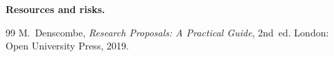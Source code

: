 \documentclass[11pt,a4paper]{article}
\begin{document}
\medskip\noindent\textbf{Resources and risks.}\par
{}
\else
{}
\fi

\renewcommand{\refname}{References\hseReq}
\begin{thebibliography}{99}
  M.~Denscombe, \emph{Research Proposals: A Practical Guide}, 2nd~ed. London: Open University Press, 2019.
\end{thebibliography}
\end{document}
